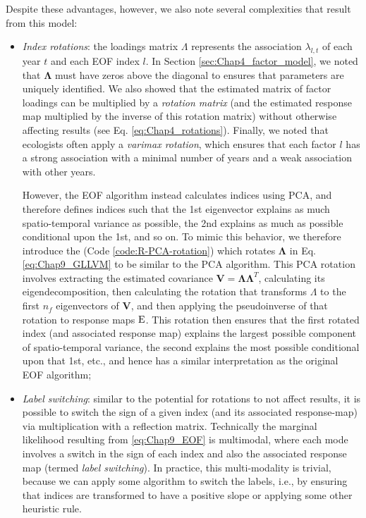 Despite these advantages, however, we also note several complexities that result from this model:
\begin{itemize}
    \item \textit{Index rotations}:  the loadings matrix \( \Lambda \) represents the association \( \lambda_{l,t} \) of each year \(t\) and each EOF index \(l\). In Section \ref{sec:Chap4_factor_model}, we noted that \(\mathbf{\Lambda}\) must have zeros above the diagonal to ensures that parameters are uniquely identified.  We also showed that the estimated matrix of factor loadings can be multiplied by a \textit{rotation matrix} (and the estimated response map multiplied by the inverse of this rotation matrix) without otherwise affecting results (see Eq. \ref{eq:Chap4_rotations}).  Finally, we noted that ecologists often apply a \textit{varimax rotation}, which ensures that each factor \(l\) has a strong association with a minimal number of years and a weak association with other years.  
    
    However, the EOF algorithm instead calculates indices using PCA, and therefore defines indices such that the 1st eigenvector explains as much spatio-temporal variance as possible, the 2nd explains as much as possible conditional upon the 1st, and so on.  To mimic this behavior, we therefore introduce the  (Code \ref{code:R-PCA-rotation}) which rotates \(\mathbf{\Lambda}\) in Eq. \ref{eq:Chap9_GLLVM} to be similar to the PCA algorithm.  This PCA rotation involves extracting the estimated covariance \( \mathbf{V=\Lambda \Lambda}^T \), calculating its eigendecomposition, then calculating the rotation that transforms \( \Lambda \) to the first \( n_f \) eigenvectors of \(\mathbf V\), and then applying the pseudoinverse of that rotation to response maps \( \mathbf{\operatorname{E}} \).  This rotation then ensures that the first rotated index (and associated response map) explains the largest possible component of spatio-temporal variance, the second explains the most possible conditional upon that 1st, etc., and hence has a similar interpretation as the original EOF algorithm;

    \item {}\textit{Label switching}:  similar to the potential for rotations to not affect results, it is possible to switch the sign of a given index (and its associated response-map) via multiplication with a reflection matrix.  Technically the marginal likelihood resulting from \ref{eq:Chap9_EOF} is multimodal, where each mode involves a switch in the sign of each index and also the associated response map (termed \textit{label switching}).  In practice, this multi-modality is trivial, because we can apply some algorithm to switch the labels, i.e., by ensuring that indices are transformed to have a positive slope or applying some other heuristic rule.  
\end{itemize}
